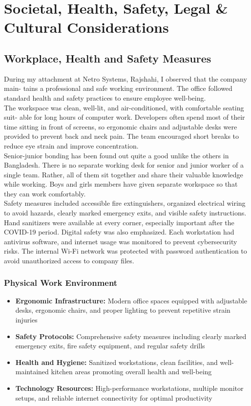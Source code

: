 \documentclass[12pt,a4paper]{report}
\newcommand{\feature}[1]{\textcolor{featurecolor}{\textbf{#1}}}
\newenvironment{coloritemize}
{\begin{itemize}[label=\textcolor{primaryblue}{$\bullet$}]}
{\end{itemize}}
\begin{document}
\chapter{Societal, Health, Safety, Legal \& Cultural Considerations}
\section{Workplace, Health and Safety Measures}
During my attachment at Netro Systems, Rajshahi, I observed that the company main-
tains a professional and safe working environment. The office followed standard health
and safety practices to ensure employee well-being.\\
The workspace was clean, well-lit, and air-conditioned, with comfortable seating suit-
able for long hours of computer work. Developers often spend most of their time sitting
in front of screens, so ergonomic chairs and adjustable desks were provided to prevent
back and neck pain. The team encouraged short breaks to reduce eye strain and improve
concentration.\\
Senior-junior bonding has been found out quite a good unlike the others in Bangladesh.
There is no separate working desk for senior and junior worker of a single team. Rather,
all of them sit together and share their valuable knowledge while working. Boys and girls
members have given separate workspace so that they can work comfortably.\\
Safety measures included accessible fire extinguishers, organized electrical wiring to
avoid hazards, clearly marked emergency exits, and visible safety instructions. Hand
sanitizers were available at every corner, especially important after the COVID-19 period.
Digital safety was also emphasized. Each workstation had antivirus software, and
internet usage was monitored to prevent cybersecurity risks. The internal Wi-Fi network
was protected with password authentication to avoid unauthorized access to company
files.

\subsection{Physical Work Environment}
\begin{coloritemize}
    \item \feature{Ergonomic Infrastructure:} Modern office spaces equipped with adjustable desks, ergonomic chairs, and proper lighting to prevent repetitive strain injuries
    \item \feature{Safety Protocols:} Comprehensive safety measures including clearly marked emergency exits, fire safety equipment, and regular safety drills
    \item \feature{Health and Hygiene:} Sanitized workstations, clean facilities, and well-maintained kitchen areas promoting overall health and well-being
    \item \feature{Technology Resources:} High-performance workstations, multiple monitor setups, and reliable internet connectivity for optimal productivity
\end{coloritemize}
\end{document}
